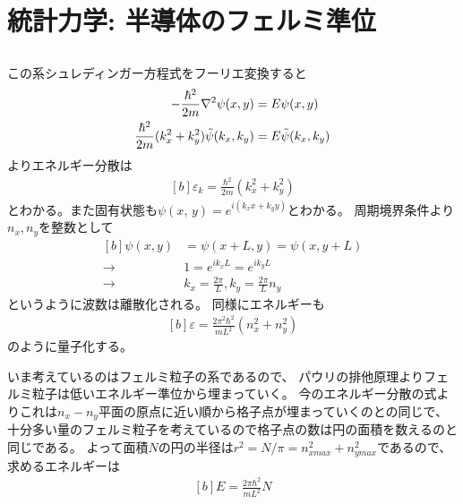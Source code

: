 \documentclass[../../master.tex]{subfiles}
\begin{document}
\section{統計力学: 半導体のフェルミ準位}
\subsection{}
この系シュレディンガー方程式をフーリエ変換すると
\begin{equation}\begin{aligned}[b]
    -\frac{\hbar^2}{2m}\laplacian\psi(x,y)&=E\psi(x,y)\\
    \frac{\hbar^2}{2m}(k_x^2+k_y^2)\tilde{\psi}(k_x,k_y) &= E \tilde{\psi}(k_x,k_y)
\end{aligned}\end{equation}
よりエネルギー分散は
\begin{equation}\begin{aligned}[b]
    \varepsilon_k = \frac{\hbar^2}{2m}(k_x^2+k_y^2)
\end{aligned}\end{equation}
とわかる。また固有状態も\(\psi(x,\,y)=e^{i(k_xx+k_yy)}\)とわかる。
周期境界条件より\(n_x,n_y\)を整数として
\begin{equation}\begin{aligned}[b]
    \psi(x,y) &= \psi(x+L,y) = \psi(x,y+L)\\
    \rightarrow\quad& 1 = e^{ik_xL} = e^{ik_y L}\\
    \rightarrow\quad& k_x = \frac{2\pi}{L},  k_y = \frac{2\pi}{L}n_y
\end{aligned}\end{equation}
というように波数は離散化される。
同様にエネルギーも
\begin{equation}\begin{aligned}[b]
    \varepsilon = \frac{2\pi^2\hbar^2}{mL^2}(n_x^2+n_y^2)
\end{aligned}\end{equation}
のように量子化する。

いま考えているのはフェルミ粒子の系であるので、
パウリの排他原理よりフェルミ粒子は低いエネルギー準位から埋まっていく。
今のエネルギー分散の式よりこれは\(n_x-n_y\)平面の原点に近い順から格子点が埋まっていくのとの同じで、
十分多い量のフェルミ粒子を考えているので格子点の数は円の面積を数えるのと同じである。
よって面積\(N\)の円の半径は\(r^2 = N/\pi = n_{xmax}^2+n_{ymax}^2\)であるので、求めるエネルギーは
\begin{equation}\begin{aligned}[b]
    E = \frac{2\pi\hbar^2}{mL^2}N
\end{aligned}\end{equation}
\end{document}
